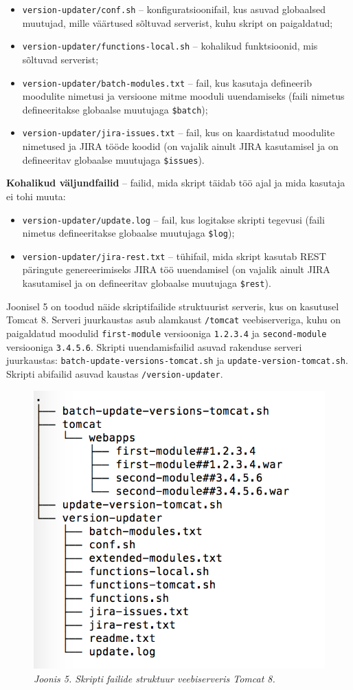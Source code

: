 \documentclass[12pt]{article}
\newcommand{\code}[1]{\texttt{#1}}
\begin{document}
  \begin{itemize}
    \item \code{version-updater/conf.sh} \--- konfiguratsioonifail, kus asuvad globaalsed muutujad, mille väärtused sõltuvad serverist, kuhu skript on paigaldatud;
    \item \code{version-updater/functions-local.sh} \--- kohalikud funktsioonid, mis sõltu\-vad serverist;
    \item \code{version-updater/batch-modules.txt} \--- fail, kus kasutaja defineerib moodulite nimetusi ja versioone mitme mooduli uuendamiseks (faili nimetus defineeritakse globaalse muutujaga \code{\$batch});
    \item \code{version-updater/jira-issues.txt} \--- fail, kus on kaardistatud moodulite nimetused ja JIRA tööde koodid (on vajalik ainult JIRA kasutamisel ja on defineeritav globaalse muutujaga \code{\$issues}).
  \end{itemize}
  
  \textbf{Kohalikud väljundfailid} \--- failid, mida skript täidab töö ajal ja mida kasutaja ei tohi muuta:
  
  \begin{itemize}
    \item \code{version-updater/update.log} \--- fail, kus logitakse skripti tegevusi (faili nimetus defineeritakse globaalse muutujaga \code{\$log});
    \item \code{version-updater/jira-rest.txt} \--- tühifail, mida skript kasutab REST \cite{rest} päringute genereerimiseks JIRA töö uuendamisel \cite{jira} (on vajalik ainult JIRA kasutamisel ja on defineeritav globaalse muutujaga \code{\$rest}).
  \end{itemize}
  
  \newpage
  
  Joonisel 5 on toodud näide skriptifailide struktuurist serveris, kus on kasutusel Tomcat 8. Serveri juurkaustas asub alamkaust \code{/tomcat} veebiserveriga, kuhu on paigaldatud moodulid \code{first-module} versiooniga \code{1.2.3.4} ja \code{second-module} versiooniga \code{3.4.5.6}. Skripti uuendamisfailid asuvad rakenduse serveri juurkaustas: \code{batch-update-versions-tomcat.sh} ja \code{update-version-tomcat.sh}. Skripti abifailid asuvad kaustas \code{/version-updater}.
  
  \begin{figure}[H] 
    \begin{center}
      \includegraphics[width=.4\textwidth]{screenshots/file-structure-on-tomcat.png}
      \caption*{\textit{Joonis 5. Skripti failide struktuur veebiserveris Tomcat 8.}}
      \end{center}
   \end{figure}
   
\end{document}
